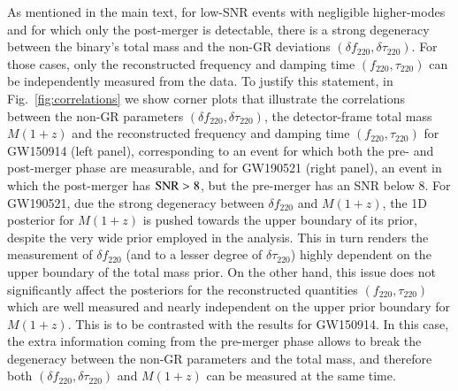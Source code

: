 \documentclass[twocolumn,prd,aps,superscriptaddress,preprintnumbers,tightenlines,showpacs,nofootinbib,eqsecnum,amsfonts,amsmath]{revtex4-1}
\newcommand{\df}[1]{\delta f_{\text{#1}}}
\newcommand{\dtau}[1]{\delta \tau_{\text{#1}}}
\begin{document}
As mentioned in the main text, for low-SNR events with negligible
higher-modes and for which only the post-merger is detectable, there
is a strong degeneracy between the binary's total mass and the non-GR
deviations $(\df{220}, \dtau{220})$. For those cases, only the
reconstructed frequency and damping time $(f_{220},\tau _{220})$ can
be independently measured from the data. To justify this statement, 
in Fig.~\ref{fig:correlations} we show
corner plots that illustrate the correlations between the non-GR
parameters $(\df{220}, \dtau{220})$, the detector-frame total mass
$M(1+z)$ and the reconstructed frequency and damping time
$(f_{220},\tau _{220})$ for GW150914 (left panel), corresponding to an
event for which both the pre- and post-merger phase are measurable,
and for GW190521 (right panel), an event in which the post-merger has
${\rm SNR}> 8$, but the pre-merger has an SNR below 8. For GW190521,
due the strong degeneracy between $\df{220}$ and $M(1+z)$, the 1D
posterior for $M(1+z)$ is pushed towards the upper boundary of its
prior, despite the very wide prior employed in the analysis. This in
turn renders the measurement of $\df{220}$ (and to a lesser degree of
$\dtau{220}$) highly dependent on the upper boundary of the total mass
prior. On the other hand, this issue does not significantly affect the
posteriors for the reconstructed quantities $(f_{220},\tau _{220})$
which are well measured and nearly independent on the upper prior
boundary for $M(1+z)$. This is to be contrasted with the results for GW150914. In this case, 
the extra information coming from the pre-merger phase allows to break 
the degeneracy between the non-GR parameters and the total mass, 
and therefore both $(\df{220}, \dtau{220})$ and $M(1+z)$ can 
be measured at the same time. 
\end{document}

